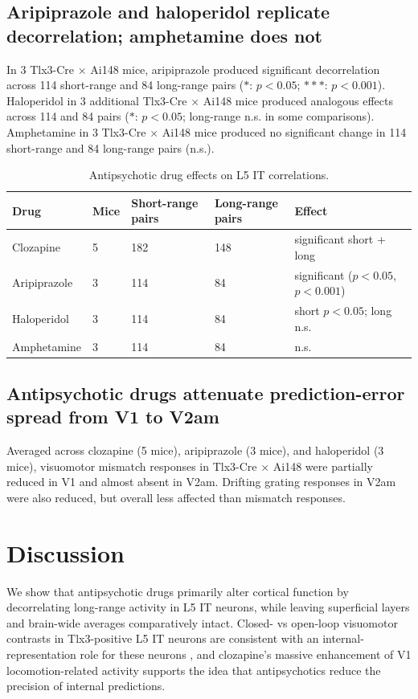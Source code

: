 \documentclass[11pt]{article}
\begin{document}
\subsection{Aripiprazole and haloperidol replicate decorrelation; amphetamine does not}
In 3 Tlx3-Cre $\times$ Ai148 mice, aripiprazole produced significant decorrelation across 114 short-range and 84 long-range pairs ($*$: $p < 0.05$; $***$: $p < 0.001$). Haloperidol in 3 additional Tlx3-Cre $\times$ Ai148 mice produced analogous effects across 114 and 84 pairs ($*$: $p < 0.05$; long-range n.s. in some comparisons). Amphetamine in 3 Tlx3-Cre $\times$ Ai148 mice produced no significant change in 114 short-range and 84 long-range pairs (n.s.).

\begin{table}[h]
\centering
\caption{Antipsychotic drug effects on L5 IT correlations.}
\begin{tabular}{lllll}
\toprule
Drug & Mice & Short-range pairs & Long-range pairs & Effect \\
\midrule
Clozapine & 5 & 182 & 148 & significant short + long \\
Aripiprazole & 3 & 114 & 84 & significant ($p < 0.05$, $p < 0.001$) \\
Haloperidol & 3 & 114 & 84 & short $p < 0.05$; long n.s. \\
Amphetamine & 3 & 114 & 84 & n.s. \\
\bottomrule
\end{tabular}
\end{table}

\subsection{Antipsychotic drugs attenuate prediction-error spread from V1 to V2am}
Averaged across clozapine (5 mice), aripiprazole (3 mice), and haloperidol (3 mice), visuomotor mismatch responses in Tlx3-Cre $\times$ Ai148 were partially reduced in V1 and almost absent in V2am. Drifting grating responses in V2am were also reduced, but overall less affected than mismatch responses.

\section{Discussion}
We show that antipsychotic drugs primarily alter cortical function by decorrelating long-range activity in L5 IT neurons, while leaving superficial layers and brain-wide averages comparatively intact. Closed- vs open-loop visuomotor contrasts in Tlx3-positive L5 IT neurons are consistent with an internal-representation role for these neurons \cite{leinweber2017sensorimotor,bastos2012canonical,keller2018predictive}, and clozapine's massive enhancement of V1 locomotion-related activity supports the idea that antipsychotics reduce the precision of internal predictions.
\end{document}
